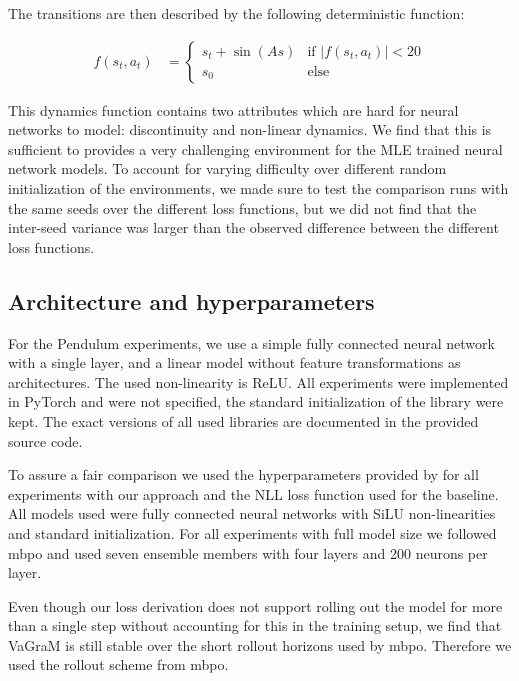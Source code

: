 The transitions are then described by the following deterministic function:

\begin{align}
    f(s_t,a_t) &= 
  \begin{cases}
    s_t + \sin(A s) & \text{if } |f(s_t,a_t)| < 20\\
    s_0 & \text{else}
  \end{cases}
\end{align}

This dynamics function contains two attributes which are hard for neural networks to model: discontinuity and non-linear dynamics.
We find that this is sufficient to provides a very challenging environment for the MLE trained neural network models.
To account for varying difficulty over different random initialization of the environments, we made sure to test the comparison runs with the same seeds over the different loss functions, but we did not find that the inter-seed variance was larger than the observed difference between the different loss functions.

\subsection{Architecture and hyperparameters}
For the Pendulum experiments, we use a simple fully connected neural network with a single layer, and a linear model without feature transformations as architectures.
The used non-linearity is ReLU.
All experiments were implemented in PyTorch \parencite{pytorch} and were not specified, the standard initialization of the library were kept.
The exact versions of all used libraries are documented in the provided source code.

To assure a fair comparison we used the hyperparameters provided by \textcite{janner2019mbpo} for all experiments with our approach and the NLL loss function used for the baseline.
All models used were fully connected neural networks with SiLU non-linearities and standard initialization.
For all experiments with full model size we followed \ac{mbpo} and used seven ensemble members with four layers and 200 neurons per layer.

Even though our loss derivation does not support rolling out the model for more than a single step without accounting for this in the training setup, we find that VaGraM is still stable over the short rollout horizons used by \ac{mbpo}.
Therefore we used the rollout scheme from \ac{mbpo}.

